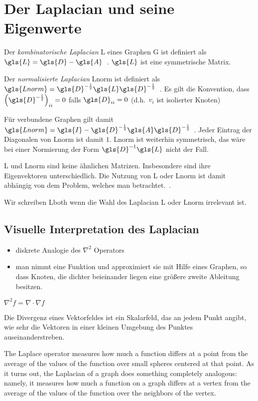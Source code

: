 \section{Der Laplacian und seine Eigenwerte}

Der \emph{kombinatorische Laplacian} \gls{L} eines Graphen \gls{G} ist definiert als $\gls{L} = \gls{D} - \gls{A}$~\cite{Chung}.
$\gls{L}$ ist eine symmetrische Matrix.

Der \emph{normalisierte Laplacian} \gls{Lnorm} ist definiert als $\gls{Lnorm} = \gls{D}^{-\frac{1}{2}} \gls{L} \gls{D}^{-\frac{1}{2}}$~\cite{Chung}.
Es gilt die Konvention, dass ${\left(\gls{D}^{-\frac{1}{2}}\right)}_{ii} = 0$ falls $\gls{D}_{ii} = 0$ (d.h.\ $v_i$ ist isolierter Knoten)

Für verbundene Graphen gilt damit $\gls{Lnorm} = \gls{I} - \gls{D}^{-\frac{1}{2}} \gls{A} \gls{D}^{-\frac{1}{2}}$~\cite{Chung}.
Jeder Eintrag der Diagonalen von \gls{Lnorm} ist damit $1$.
\gls{Lnorm} ist weiterhin symmetrisch, das wäre bei einer Normierung der Form $\gls{D}^{-1}\gls{L}$ nicht der Fall.

\gls{L} und \gls{Lnorm} sind keine ähnlichen Matrizen.
Insbesondere sind ihre Eigenvektoren unterschiedlich.
Die Nutzung von \gls{L} oder \gls{Lnorm} ist damit abhängig von dem Problem, welches man betrachtet.~\cite{Hammond}.

Wir schreiben \gls{Lboth} wenn die Wahl des Laplacian \gls{L} oder \gls{Lnorm} irrelevant ist.

\subsection{Visuelle Interpretation des Laplacian}

\begin{itemize}
  \item diskrete Analogie des $\nabla^2$ Operators
  \item man nimmt eine Funktion und approximiert sie mit Hilfe eines Graphen, so dass Knoten, die dichter beieinander liegen eine größere zweite Ableitung besitzen.
\end{itemize}


$\nabla^2 f = \nabla \cdot \nabla f$

Die Divergenz eines Vektorfeldes ist ein Skalarfeld, das an jedem Punkt angibt, wie sehr die Vektoren in einer kleinen Umgebung des Punktes auseinanderstreben.

The Laplace operator measures how much a function differs at a point from the average of the values of the function over small spheres centered at that point. As it turns out, the Laplacian of a graph does something completely analogous: namely, it measures how much a function on a graph differs at a vertex from the average of the values of the function over the neighbors of the vertex.

